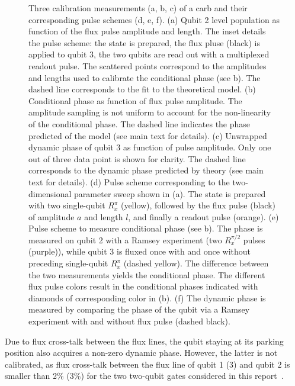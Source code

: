 \begin{figure}[H]
    \caption{Three calibration measurements (a, b, c) of a \gls{carb} and their corresponding pulse schemes (d, e, f).  (a) Qubit 2 \e{} level population as function of the flux pulse amplitude and length. The inset details the pulse scheme: the \oo{} state is prepared, the flux pluse (black) is  applied to qubit 3, the two qubits are read out with a multiplexed readout pulse. The scattered points correspond to the amplitudes and lengths used to calibrate the conditional phase (see b). The dashed line corresponds to the fit to the theoretical model. (b) Conditional phase as function of flux pulse amplitude. The amplitude sampling is not uniform to account for the non-linearity of the conditional phase. The dashed line indicates the phase predicted of the model (see main text for details).  (c) Unwrapped dynamic phase of qubit 3 as function of pulse amplitude. Only one out of three data point is shown for clarity.  The dashed line corresponds to the dynamic phase predicted by theory (see main text for details). (d) Pulse scheme corresponding to the two-dimensional parameter sweep shown in (a). The \oo{} state is prepared with two single-qubit $R_x^\pi$ (yellow), followed by the flux pulse (black) of amplitude $a$ and length $l$, and finally a readout pulse (orange). (e) Pulse scheme to measure conditional phase (see b). The phase is measured on qubit 2 with a Ramsey experiment (two $R_x^{\pi/2}$ pulses (purple)), while qubit 3 is fluxed once with and once without preceding single-qubit $R_x^{\pi}$ (dashed yellow). The difference between the two measurements yields the conditional phase. The different flux pulse colors result in the conditional phases indicated with diamonds of corresponding color in (b). (f) The dynamic phase is measured by comparing the phase of the qubit via a Ramsey experiment with and without flux pulse (dashed black).}
    \label{fig:ch4_calibration_carb}
\end{figure}

Due to flux cross-talk between the flux lines, the qubit staying at its parking position also acquires a non-zero dynamic phase. However, the latter is not calibrated, as flux cross-talk between the flux line of qubit 1 (3) and qubit 2 is smaller than 2\% (3\%) for the two two-qubit gates considered in this report~\cite{Andersen2018SampleB4QP3}.

